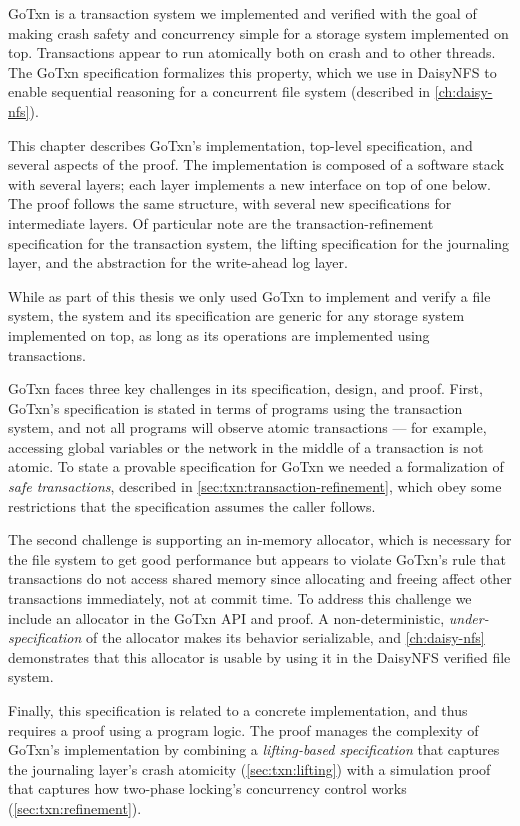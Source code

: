 GoTxn is a transaction system we implemented and verified with the goal of
making crash safety and concurrency simple for a storage system implemented on
top. Transactions appear to run atomically both on crash and to other threads.
The GoTxn specification formalizes this property, which we use in DaisyNFS to
enable sequential reasoning for a concurrent file system (described in
\cref{ch:daisy-nfs}).

This chapter describes GoTxn's implementation, top-level specification, and
several aspects of the proof. The implementation is composed of a software stack
with several layers; each layer implements a new interface on top of one
below. The proof follows the same structure, with several new specifications for
intermediate layers. Of particular note are the
transaction-refinement specification for the transaction system, the lifting
specification for the journaling layer, and the abstraction for the write-ahead
log layer.

While as part of this thesis we only used GoTxn to implement and verify a file
system, the system and its specification are generic for any
storage system implemented on top, as long as its operations are implemented
using transactions.

GoTxn faces three key challenges in its specification, design, and proof.
First, GoTxn's specification is stated in terms of programs using the
transaction system, and not all programs will observe atomic transactions ---
for example, accessing global variables or the network in the middle of a
transaction is not atomic. To state a provable specification for GoTxn we needed
a formalization of \emph{safe transactions}, described in \cref{sec:txn:transaction-refinement},
which obey some restrictions that the specification assumes the caller follows.

The second challenge is supporting an in-memory allocator, which is necessary
for the file system to get good performance but appears to violate GoTxn's rule
that transactions do not access shared memory since allocating and
freeing affect other transactions immediately, not at commit time.
To address this challenge we include an
allocator in the GoTxn API and proof. A non-deterministic,
\emph{under-specification} of the allocator makes its behavior serializable, and
\cref{ch:daisy-nfs} demonstrates that this allocator is usable by using it in
the DaisyNFS verified file system.

Finally, this specification is related to a concrete implementation, and thus
requires a proof using a program logic. The proof manages the complexity of
GoTxn's implementation by combining a \emph{lifting-based specification} that
captures the journaling layer's crash atomicity (\cref{sec:txn:lifting}) with a
simulation proof that captures how two-phase locking's concurrency control works
(\cref{sec:txn:refinement}).

